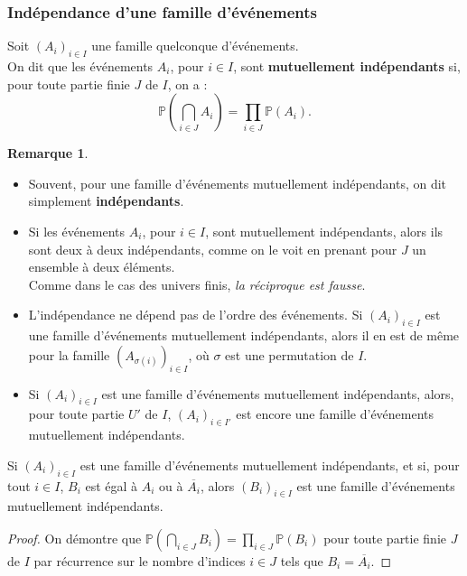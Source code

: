 \documentclass[french]{article}
\renewcommand{\P}{\mathbb{P}}
\theoremstyle{plain}
\theoremstyle{definition}
\newtheorem*{rmq}{Remarque}
\theoremstyle{remark}
\begin{document}
\subsubsection*{Indépendance d'une famille d'événements}

\begin{dfn}
	Soit $(A_i)_{i\in I}$ une famille quelconque d'événements.\\
	On dit que les événements $A_i$, pour $i\in I$, sont \textbf{mutuellement indépendants} si, pour toute partie finie $J$ de $I$, on a : $$\P\left(\bigcap_{i\in J}A_i\right)=\prod_{i\in J}\P(A_i).$$
\end{dfn}

\begin{rmq}
	\begin{itemize}
		\item Souvent, pour une famille d'événements mutuellement indépendants, on dit simplement \textbf{indépendants}.
		\item Si les événements $A_i$, pour $i\in I$, sont mutuellement indépendants, alors ils sont deux à deux indépendants, comme on le voit en prenant pour $J$ un ensemble à deux éléments.\\
		Comme dans le cas des univers finis, \textit{la réciproque est fausse}.
		\item L'indépendance ne dépend pas de l'ordre des événements. Si $(A_i)_{i\in I}$ est une famille d'événements mutuellement indépendants, alors il en est de même pour la famille $(A_{\sigma(i)})_{i\in I}$, où $\sigma$ est une permutation de $I$.
		\item Si $(A_i)_{i\in I}$ est une famille d'événements mutuellement indépendants, alors, pour toute partie $U'$ de $I$, $(A_i)_{i\in I'}$ est encore une famille d'événements mutuellement indépendants.
	\end{itemize}
\end{rmq}

\begin{thm}%
	Si $(A_i)_{i\in I}$ est une famille d'événements mutuellement indépendants, et si, pour tout $i\in I$, $B_i$ est égal à $A_i$ ou à $\overline{A_i}$, alors $(B_i)_{i\in I}$ est une famille d'événements mutuellement indépendants.
\end{thm}
\begin{proof}
	On démontre que $\displaystyle\P\left(\bigcap_{i\in J}B_i\right)=\prod_{i\in J}\P(B_i)$ pour toute partie finie $J$ de $I$ par récurrence sur le nombre d'indices $i\in J$ tels que $B_i=\overline{A_i}$.
\end{proof}
\end{document}

